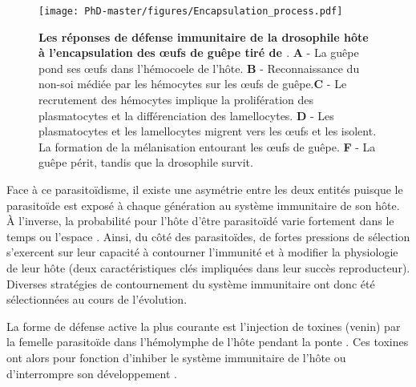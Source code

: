 \begin{figure}[!htpbt]
\captionsetup{font=footnotesize}
 \centering
  \texttt{[image: PhD-master/figures/Encapsulation\_process.pdf]}
\caption[Intro:Schéma d'encapsulation général chez la drosophile]{\textbf{Les réponses de défense immunitaire de la drosophile hôte à l'encapsulation des œufs de guêpe tiré de \cite{yang_cellular_2021}}. \textbf{A} - La guêpe pond ses œufs dans l'hémocoele de l'hôte. \textbf{B} - Reconnaissance du non-soi médiée par les hémocytes sur les œufs de guêpe.\textbf{C} - Le recrutement des hémocytes implique la prolifération des plasmatocytes et la différenciation des lamellocytes. \textbf{D} - Les plasmatocytes et les lamellocytes migrent vers les œufs et les isolent. La formation de la mélanisation entourant les œufs de guêpe. \textbf{F} -  La guêpe périt, tandis que la drosophile survit.}
\label{figure:Encapsulation_process}
\end{figure}


Face à ce parasitoïdisme, il existe une asymétrie entre les deux entités puisque le parasitoïde est exposé à chaque génération au système immunitaire de son hôte. À l'inverse, la probabilité pour l'hôte d'être parasitoïdé varie fortement dans le temps ou l'espace \citep{fleury_chapter_2009}. Ainsi, du côté des parasitoïdes, de fortes pressions de sélection s'exercent sur leur capacité à contourner l'immunité et à modifier la physiologie de leur hôte (deux caractéristiques clés impliquées dans leur succès reproducteur). Diverses stratégies de contournement du système immunitaire ont donc été sélectionnées au cours de l'évolution. 

La forme de défense active la plus courante est l’injection de toxines (venin) par la femelle parasitoïde dans l'hémolymphe de l'hôte pendant la ponte \citep{asgari_venom_2011, moreau_venom_2015}. Ces toxines ont alors pour fonction d'inhiber le système immunitaire de l’hôte ou d'interrompre son développement \citep{moreau_venom_2015}. 

